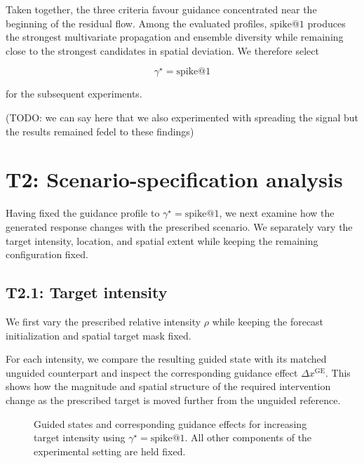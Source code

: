 Taken together, the three criteria favour guidance concentrated near the
beginning of the residual flow. Among the evaluated profiles,
$\mathrm{spike@1}$ produces the strongest multivariate propagation and
ensemble diversity while remaining close to the strongest candidates in
spatial deviation. We therefore select

\begin{equation}
    \gamma^\star = \mathrm{spike@1}
    \label{eq:selected-guidance-profile}
\end{equation}

for the subsequent experiments.

(TODO: we can say here that we also experimented with spreading the signal but the results remained fedel to these findings)


\section{T2: Scenario-specification analysis}
\label{sec:scenario-specification-analysis}

Having fixed the guidance profile to
$\gamma^\star=\mathrm{spike@1}$, we next examine how the generated response
changes with the prescribed scenario. We separately vary the target intensity,
location, and spatial extent while keeping the remaining configuration fixed.


\subsection{T2.1: Target intensity}
\label{sec:target-intensity-analysis}

We first vary the prescribed relative intensity $\rho$ while keeping the
forecast initialization and spatial target mask fixed.


For each intensity, we compare the resulting guided state with its matched
unguided counterpart and inspect the corresponding guidance effect
$\Delta x^{\mathrm{GE}}$. This shows how the magnitude and spatial structure
of the required intervention change as the prescribed target is moved further
from the unguided reference.

\begin{figure}[H]
    \centering
    \caption{
        Guided states and corresponding guidance effects for increasing target
        intensity using $\gamma^\star=\mathrm{spike@1}$. All other components
        of the experimental setting are held fixed.
    }
    \label{fig:t2-target-intensity}
\end{figure}

